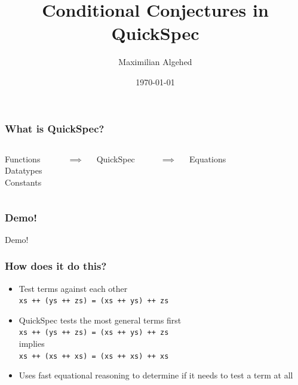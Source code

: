 \documentclass{beamer}
\title[Conditional Conjectures in QuickSpec]{Conditional Conjectures in QuickSpec} %
\author{Maximilian Algehed} %
\institute[CTH] %
{
Chalmers University of Technology \\ %
\medskip
\textit{m.algehed@gmail.com} %
}
\date{\today} %
\begin{document}
\begin{frame}
    \titlepage %
\end{frame}

\begin{frame}
    \frametitle{What is QuickSpec?}
    \begin{columns}
        \begin{block}{}
            Functions\\
            Datatypes\\
            Constants\\
        \end{block}

        \\
        \centerline{\Large{$\implies$}}

        \begin{block}{}
            QuickSpec
        \end{block}
        
        \\
        \centerline{\Large{$\implies$}}

        \begin{block}{}
            Equations
        \end{block}
    \end{columns}
\end{frame}

\begin{frame}
    \frametitle{Demo!}
        \Huge{\centerline{Demo!}}
\end{frame}

\begin{frame}
    \frametitle{How does it do this?}
        \begin{itemize}
            \item Test terms against each other\\\texttt{xs ++ (ys ++ zs) = (xs ++ ys) ++ zs}
            \item QuickSpec tests the most general terms first\\
                \texttt{xs ++ (ys ++ zs) = (xs ++ ys) ++ zs}\\implies\\\texttt{xs ++ (xs ++ xs) = (xs ++ xs) ++ xs}
            \item Uses fast equational reasoning to determine if it needs to test a term at all
        \end{itemize}
\end{frame}
\end{document}

